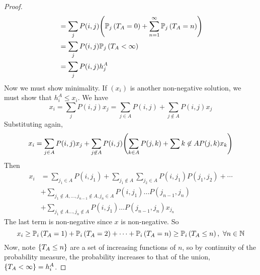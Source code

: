 \begin{proof}
\begin{align*}
		                       & = \sum_j P(i,j) \qty( \mathbb{P}_{j}\left({T_A = 0}\right) + \sum_{n=1}^\infty \mathbb{P}_{j}\left({T_A = n}\right) )                                            \\
		                       & = \sum_j P(i,j) \mathbb{P}_{j}\left({T_A < \infty}\right)                                                                                     \\
		                       & = \sum_j P(i,j) h_j^A
	\end{align*}
	Now we must show minimality.
	If \( (x_i) \) is another non-negative solution, we must show that \( h_i^A \leq x_i \).
	We have
	\[
		x_i = \sum_j P(i,j) x_j = \sum_{j \in A} P(i,j) + \sum_{j \not\in A} P(i,j) x_j
	\]
	Substituting again,
	\[
		x_i = \sum_{j \in A} P(i,j) x_j + \sum_{j \not\in A} P(i,j) \qty( \sum_{k \in A} P(j,k) + \sum{k \not\in A} P(j,k) x_k )
	\]
	Then
	\begin{align*}
		x_i & = \sum_{j_1 \in A} P(i,j_1) + \sum_{j_1 \not\in A} \sum_{j_2 \in A} P(i,j_1)P(j_1,j_2) + \cdots \\
		    & + \sum_{j_1 \not\in A, \dots, j_{n-1} \not\in A, j_n \in A} P(i,j_1)\dots P(j_{n-1},j_n)        \\
		    & + \sum_{j_1 \not\in A \dots, j_n \not\in A} P(i,j_1)\dots P(j_{n-1},j_n) x_{j_n}
	\end{align*}
	The last term is non-negative since \( x \) is non-negative.
	So
	\[
		x_i \geq \mathbb{P}_{i}\left({T_A = 1}\right) + \mathbb{P}_{i}\left({T_A = 2}\right) + \dots + \mathbb{P}_{i}\left({T_A = n}\right) \geq \mathbb{P}_{i}\left({T_A \leq n}\right),\ \forall n \in \mathbb N
	\]
	Now, note \( \qty{T_A \leq n} \) are a set of increasing functions of \( n \), so by continuity of the probability measure, the probability increases to that of the union, \( \qty{T_A < \infty} = h_i^A \).
\end{proof}

